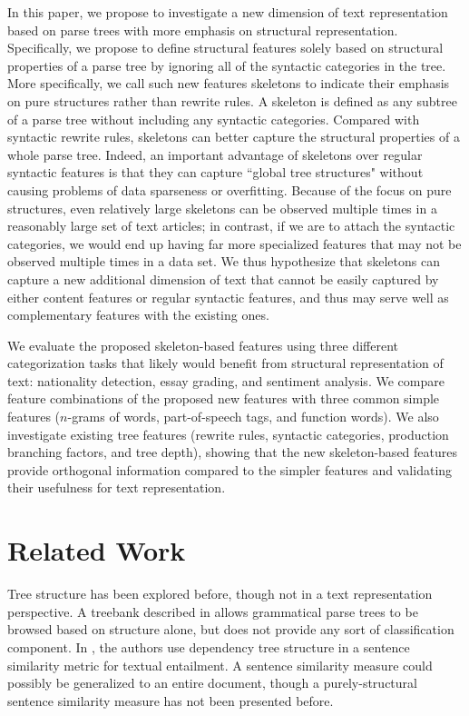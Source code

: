 \documentclass[conference]{IEEEtran}
\begin{document}
In this paper, we propose to investigate a new dimension of text representation
based on parse trees with more emphasis on structural representation.
Specifically, we propose to define structural features solely based on
structural properties of a parse tree by ignoring all of the syntactic
categories in the tree. More specifically, we call such new features skeletons
to indicate their emphasis on pure structures rather than rewrite rules. A
skeleton is defined as any subtree of a parse tree without including any
syntactic categories. Compared with syntactic rewrite rules, skeletons can
better capture the structural properties of a whole parse tree. Indeed, an
important advantage of skeletons over regular syntactic features is that they
can capture ``global tree structures" without causing problems of data
sparseness or overfitting. Because of the focus on pure structures, even
relatively large skeletons can be observed multiple times in a reasonably large
set of text articles; in contrast, if we are to attach the syntactic categories,
we would end up having far more specialized features that may not be observed
multiple times in a data set.  We thus hypothesize that skeletons can capture a
new additional dimension of text that cannot be easily captured by either
content features or regular syntactic features, and thus may serve well as
complementary features with the existing ones.

We evaluate the proposed skeleton-based features using three different
categorization tasks that likely would benefit from structural representation of
text: nationality detection, essay grading, and sentiment analysis. We compare
feature combinations of the proposed new features with three common simple
features ($n$-grams of words, part-of-speech tags, and function words). We also
investigate existing tree features (rewrite rules, syntactic categories,
production branching factors, and tree depth), showing that the new
skeleton-based features provide orthogonal information compared to the simpler
features and validating their usefulness for text representation.

\section{Related Work}

Tree structure has been explored before, though not in a text representation
perspective. A treebank described in \cite{coling-black-1996} allows
grammatical parse trees to be browsed based on structure alone, but does not
provide any sort of classification component. In \cite{acl-wang-2007}, the
authors use dependency tree structure in a sentence similarity metric for
textual entailment. A sentence similarity measure could possibly be generalized
to an entire document, though a purely-structural sentence similarity measure
has not been presented before.
\end{document}
